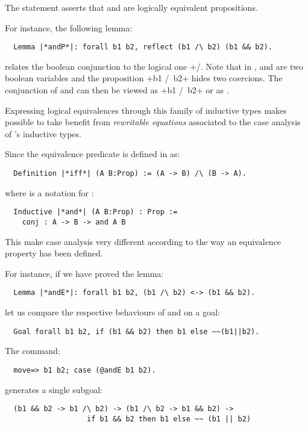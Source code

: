 The statement  asserts that 
and  are logically equivalent propositions.

For instance, the following lemma:
\begin{lstlisting}
  Lemma |*andP*|: forall b1 b2, reflect (b1 /\ b2) (b1 && b2).
\end{lstlisting}
relates the boolean conjunction \ssrC{&&} to
the logical one \ssrL+/\+.
Note that in ,  and  are two boolean variables and
the proposition \ssrL+b1 /\ b2+ hides two coercions.
The conjunction of  and  can then be viewed
as \ssrL+b1 /\ b2+  or as .


Expressing logical equivalences through this family of inductive types
makes possible to take benefit from \emph{rewritable equations}
associated to the case analysis of \Coq{}'s inductive types.

Since the equivalence predicate is defined in \Coq{} as:
\begin{lstlisting}
  Definition |*iff*| (A B:Prop) := (A -> B) /\ (B -> A).
\end{lstlisting}
where \ssrC{/\\} is a notation for :
\begin{lstlisting}
  Inductive |*and*| (A B:Prop) : Prop :=
    conj : A -> B -> and A B
\end{lstlisting}

This make case analysis very different according to the way an
equivalence property has been defined.


For instance, if we have proved the lemma:
\begin{lstlisting}
  Lemma |*andE*|: forall b1 b2, (b1 /\ b2) <-> (b1 && b2).
\end{lstlisting}
let us compare the respective behaviours of  and  on a
goal:
\begin{lstlisting}
  Goal forall b1 b2, if (b1 && b2) then b1 else ~~(b1||b2).
\end{lstlisting}

The command:
\begin{lstlisting}
  move=> b1 b2; case (@andE b1 b2).
\end{lstlisting}
generates a single subgoal:
\begin{lstlisting}
  (b1 && b2 -> b1 /\ b2) -> (b1 /\ b2 -> b1 && b2) ->
                   if b1 && b2 then b1 else ~~ (b1 || b2)
\end{lstlisting}

